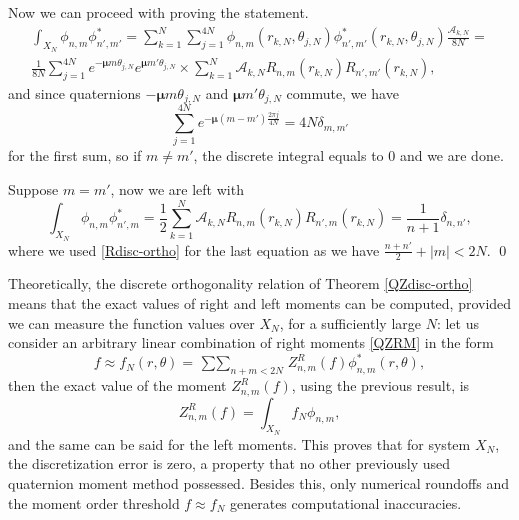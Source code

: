 \documentclass[12pt]{article}
\newcommand{\qmu}{\boldsymbol{\mu}}
\begin{document}
Now we can proceed with proving the statement. 
\[
\begin{gathered}
	\int_{X_N} \phi_{n,m} \phi^*_{n',m'} = \sum_{k=1}^{N} \sum_{j=1}^{4N} \phi_{n,m}(r_{k,N},\theta_{j,N}) \phi^*_{n',m'}(r_{k,N},					\theta_{j,N}) \frac{\mathcal{A}_{k,N}}{8N} = \\
	\frac{1}{8N} \sum_{j=1}^{4N} e^{-\qmu m\theta_{j,N}}e^{\qmu m' \theta_{j,N}} \times \sum_{k=1}^N \mathcal{A}_{k,N} R_{n,m}(r_{k,N}) R_{n',m'}				(r_{k,N}),
\end{gathered}
\]
and since quaternions $-\qmu m\theta_{j,N}$ and $\qmu m' \theta_{j,N}$ commute, we have
\[
	\sum_{j=1}^{4N} e^{-\qmu (m-m')\frac{2\pi j}{4N}} = 4N\delta_{m,m'}
\]
for the first sum, so if $m\neq m'$, the discrete integral equals to $0$ and we are done.

Suppose $m=m'$, now we are left with
\[
	\int_{X_N} \phi_{n,m} \phi^*_{n',m} = \frac{1}{2} \sum_{k=1}^N \mathcal{A}_{k,N} R_{n,m}(r_{k,N}) R_{n',m}(r_{k,N}) = \frac{1}{n+1}\delta_{n,n'},
\]
where we used \eqref{Rdisc-ortho} for the last equation as we have $\frac{n+n'}{2}+|m| < 2N$.
\qed

Theoretically, the discrete orthogonality relation of Theorem \ref{QZdisc-ortho} means that the exact values of right and left moments can be computed, provided we can measure the function values over $X_N$, for a sufficiently large $N$: let us consider an arbitrary linear combination of right moments \eqref{QZRM} in the form
\[
	f \approx f_N(r,\theta) = \mathop{\sum\sum}_{n+m<2N} Z^R_{n,m}(f) \phi^*_{n,m} (r,\theta),
\]
then the exact value of the moment $Z^R_{n,m}(f)$, using the previous result, is
\[
	Z^R_{n,m}(f) = \int_{X_N} f_N\phi_{n,m},
\]
and the same can be said for the left moments. This proves that for system $X_N$, the discretization error is zero, a property that no other previously used quaternion moment method possessed. Besides this, only numerical roundoffs and the moment order threshold $f \approx f_N$ generates computational inaccuracies.
\end{document}
